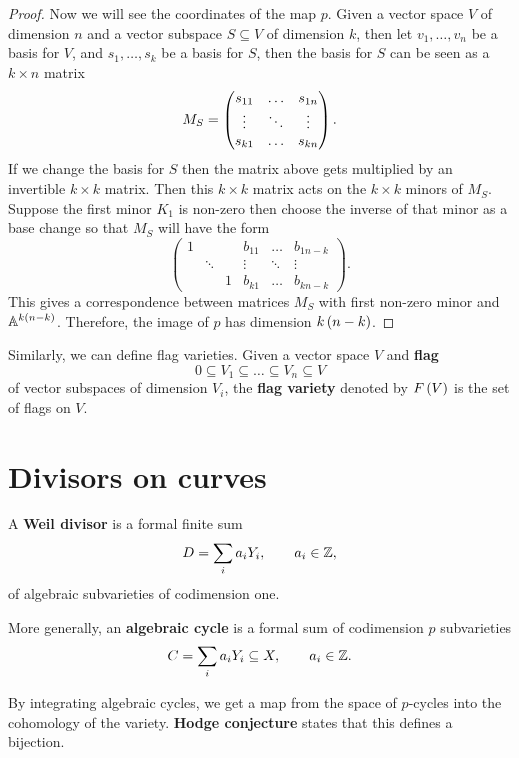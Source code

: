 \begin{proof}
Now we will see the coordinates of the map $ p $. Given a vector space $ V $ of dimension $ n $ and a vector subspace $ S \subseteq V $ of dimension $ k $, then let $ v_1, \dots, v_n $ be a basis for $ V $, and $ s_1, \dots, s_k $ be a basis for $ S $, then the basis for $ S $ can be seen as a $ k \times n $ matrix
$$ M_S = \threebythree{s_{11}}{\dots}{s_{1n}}{\vdots}{\ddots}{\vdots}{s_{k1}}{\dots}{s_{kn}}. $$
If we change the basis for $ S $ then the matrix above gets multiplied by an invertible $ k \times k $ matrix. Then this $ k \times k $ matrix acts on the $ k \times k $ minors of $ M_S $. Suppose the first minor $ K_1 $ is non-zero then choose the inverse of that minor as a base change so that $ M_S $ will have the form
$$
\begin{pmatrix}
1 & & & b_{11} & \dots & b_{1n - k} \\
& \ddots & & \vdots & \ddots & \vdots \\
& & 1 & b_{k1} & \dots & b_{kn - k}
\end{pmatrix}.
$$
This gives a correspondence between matrices $ M_S $ with first non-zero minor and $ \mathbb{A}^{k\left( n - k \right)} $. Therefore, the image of $ p $ has dimension $ k\left( n - k \right) $.
\end{proof}

Similarly, we can define flag varieties. Given a vector space $ V $ and \textbf{flag}
$$ 0 \subseteq V_1 \subseteq \dots \subseteq V_n \subseteq V $$
of vector subspaces of dimension $ V_i $, the \textbf{flag variety} denoted by $ F\left( V \right) $ is the set of flags on $ V $.

\pagebreak

\section{Divisors on curves}

\begin{definition}
A \textbf{Weil divisor} is a formal finite sum
$$ D = \sum_i a_iY_i, \qquad a_i \in \mathbb{Z}, $$
of algebraic subvarieties of codimension one.
\end{definition}

\begin{definition}
More generally, an \textbf{algebraic cycle} is a formal sum of codimension $ p $ subvarieties
$$ C = \sum_i a_iY_i \subseteq X, \qquad a_i \in \mathbb{Z}. $$
\end{definition}

By integrating algebraic cycles, we get a map from the space of $ p $-cycles into the cohomology of the variety. \textbf{Hodge conjecture} states that this defines a bijection.

